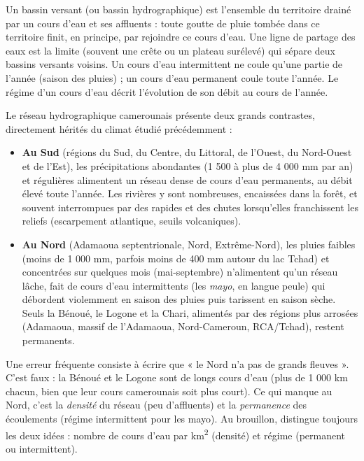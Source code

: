 \documentclass[11pt]{article}
\newcommand{\cle}[1]{{\popxbold\color{popdark}#1}}
\begin{document}
\begin{definition}
Un \cle{bassin versant} (ou bassin hydrographique) est l'ensemble du territoire drainé par un cours d'eau et ses affluents : toute goutte de pluie tombée dans ce territoire finit, en principe, par rejoindre ce cours d'eau. Une \cle{ligne de partage des eaux} est la limite (souvent une crête ou un plateau surélevé) qui sépare deux bassins versants voisins. Un \cle{cours d'eau intermittent} ne coule qu'une partie de l'année (saison des pluies) ; un cours d'eau \cle{permanent} coule toute l'année. Le \cle{régime} d'un cours d'eau décrit l'évolution de son débit au cours de l'année.
\end{definition}

Le réseau hydrographique camerounais présente deux grands contrastes, directement hérités du climat étudié précédemment :

\begin{itemize}
\item \textbf{Au Sud} (régions du Sud, du Centre, du Littoral, de l'Ouest, du Nord-Ouest et de l'Est), les précipitations abondantes (1 500 à plus de 4 000 mm par an) et régulières alimentent un réseau \cle{dense} de cours d'eau permanents, au débit élevé toute l'année. Les rivières y sont nombreuses, encaissées dans la forêt, et souvent interrompues par des rapides et des chutes lorsqu'elles franchissent les reliefs (escarpement atlantique, seuils volcaniques).
\item \textbf{Au Nord} (Adamaoua septentrionale, Nord, Extrême-Nord), les pluies faibles (moins de 1 000 mm, parfois moins de 400 mm autour du lac Tchad) et concentrées sur quelques mois (mai-septembre) n'alimentent qu'un réseau \cle{lâche}, fait de cours d'eau intermittents (les \emph{mayo}, en langue peule) qui débordent violemment en saison des pluies puis tarissent en saison sèche. Seuls la Bénoué, le Logone et la Chari, alimentés par des régions plus arrosées (Adamaoua, massif de l'Adamaoua, Nord-Cameroun, RCA/Tchad), restent permanents.
\end{itemize}

\begin{attention}
Une erreur fréquente consiste à écrire que « le Nord n'a pas de grands fleuves ». C'est faux : la Bénoué et le Logone sont de longs cours d'eau (plus de 1 000 km chacun, bien que leur cours camerounais soit plus court). Ce qui manque au Nord, c'est la \emph{densité} du réseau (peu d'affluents) et la \emph{permanence} des écoulements (régime intermittent pour les mayo). Au brouillon, distingue toujours les deux idées : nombre de cours d'eau par km\textsuperscript{2} (densité) et régime (permanent ou intermittent).
\end{attention}
\end{document}
